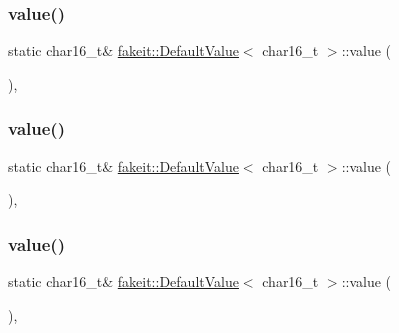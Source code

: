 \subsubsection{\texorpdfstring{value()}{value()}\hspace{0.1cm}{\footnotesize\ttfamily [6/9]}}
{\footnotesize\ttfamily static char16\+\_\+t\& \mbox{\hyperlink{structfakeit_1_1DefaultValue}{fakeit\+::\+Default\+Value}}$<$ char16\+\_\+t $>$\+::value (\begin{DoxyParamCaption}{ }\end{DoxyParamCaption})\hspace{0.3cm}{\ttfamily [inline]}, {\ttfamily [static]}}

\mbox{\label{structfakeit_1_1DefaultValue_3_01char16__t_01_4_a9d63a20d4075a4a970a51752fda22dfc}} 
\subsubsection{\texorpdfstring{value()}{value()}\hspace{0.1cm}{\footnotesize\ttfamily [7/9]}}
{\footnotesize\ttfamily static char16\+\_\+t\& \mbox{\hyperlink{structfakeit_1_1DefaultValue}{fakeit\+::\+Default\+Value}}$<$ char16\+\_\+t $>$\+::value (\begin{DoxyParamCaption}{ }\end{DoxyParamCaption})\hspace{0.3cm}{\ttfamily [inline]}, {\ttfamily [static]}}

\mbox{\label{structfakeit_1_1DefaultValue_3_01char16__t_01_4_a9d63a20d4075a4a970a51752fda22dfc}} 
\subsubsection{\texorpdfstring{value()}{value()}\hspace{0.1cm}{\footnotesize\ttfamily [8/9]}}
{\footnotesize\ttfamily static char16\+\_\+t\& \mbox{\hyperlink{structfakeit_1_1DefaultValue}{fakeit\+::\+Default\+Value}}$<$ char16\+\_\+t $>$\+::value (\begin{DoxyParamCaption}{ }\end{DoxyParamCaption})\hspace{0.3cm}{\ttfamily [inline]}, {\ttfamily [static]}}

